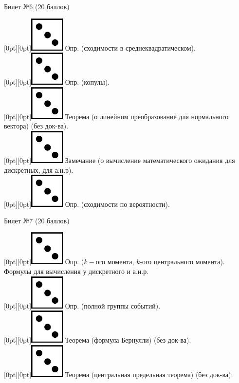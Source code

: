 \documentclass[preview]{standalone}
\begin{document}
\begin{center} {\Large Билет №6 (20 баллов)} \end{center}
\raisebox{-1pt}[0pt][0pt]{\includegraphics[width=0.02\linewidth]{3.png}} Опр. (сходимости в среднеквадратическом). \\
\raisebox{-1pt}[0pt][0pt]{\includegraphics[width=0.02\linewidth]{3.png}} Опр. (копулы). \\
\raisebox{-1pt}[0pt][0pt]{\includegraphics[width=0.02\linewidth]{3.png}} Теорема (о линейном преобразование для нормального вектора) (без док-ва). \\
\raisebox{-1pt}[0pt][0pt]{\includegraphics[width=0.02\linewidth]{3.png}} Замечание (о вычисление  математического ожидания для дискретных, для а.н.р). \\
\raisebox{-1pt}[0pt][0pt]{\includegraphics[width=0.02\linewidth]{3.png}} Опр. (сходимости по вероятности). \\
\begin{center} {\Large Билет №7 (20 баллов)} \end{center}
\raisebox{-1pt}[0pt][0pt]{\includegraphics[width=0.02\linewidth]{3.png}} Опр. ($k-$ого момента, $k$-ого центрального момента). Формулы для вычисления у дискретного и а.н.р. \\
\raisebox{-1pt}[0pt][0pt]{\includegraphics[width=0.02\linewidth]{3.png}} Опр. (полной группы событий). \\
\raisebox{-1pt}[0pt][0pt]{\includegraphics[width=0.02\linewidth]{3.png}} Теорема (формула Бернулли) (без док-ва). \\
\raisebox{-1pt}[0pt][0pt]{\includegraphics[width=0.02\linewidth]{3.png}} Теорема (центральная предельная теорема) (без док-ва). \\
\end{document}
